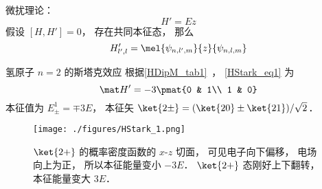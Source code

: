 
\begin{issues}
\issueDraft
\end{issues}


微扰理论：
\begin{equation}
H' = E z
\end{equation}
假设 $[H, H'] = 0$， 存在共同本征态， 那么
\begin{equation}\label{HStark_eq1}
H'_{l',l} = \mel{\psi_{n,l',m}}{z}{\psi_{n,l,m}}
\end{equation}


\begin{example}{氢原子 $n=2$ 的斯塔克效应}
根据\autoref{HDipM_tab1}~， \autoref{HStark_eq1} 为
\begin{equation}
\mat H' = -3\pmat{0 & 1\\ 1 & 0}
\end{equation}
本征值为 $E_{\pm}^1 = \mp 3E$， 本征矢 $\ket{2\pm} = (\ket{20} \pm \ket{21})/{\sqrt 2}$．

\begin{figure}[ht]
\centering
\texttt{[image: ./figures/HStark\_1.png]}
\caption{$\ket{2+}$ 的概率密度函数的 $x$-$z$ 切面， 可见电子向下偏移， 电场向上为正， 所以本征能量变小 $-3E$． $\ket{2+}$ 态刚好上下翻转， 本征能量变大 $3E$．} \label{HStark_fig1}
\end{figure}
\end{example}
